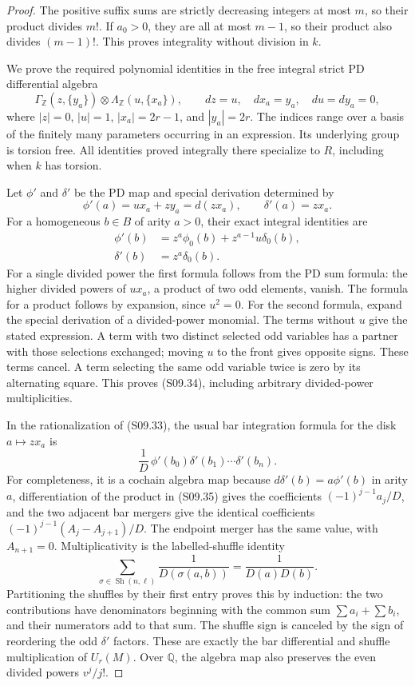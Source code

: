 \begin{proof}
The positive suffix sums are strictly decreasing
integers at most $m$, so their product divides $m!$.
If $a_0>0$, they are all at most $m-1$, so their
product also divides $(m-1)!$.  This proves integrality
without division in $k$.

We prove the required polynomial identities in the free
integral strict PD differential algebra
\[
 \Gamma_{\mathbb Z}(z,\{y_a\})\otimes
       \Lambda_{\mathbb Z}(u,\{x_a\}),
 \qquad dz=u,\quad dx_a=y_a,\quad du=dy_a=0,
 \tag{S09.33}
\]
where $|z|=0$, $|u|=1$, $|x_a|=2r-1$, and $|y_a|=2r$.
The indices range over a basis of the finitely many
parameters occurring in an expression.  Its underlying
group is torsion free.  All identities proved integrally
there specialize to $R$, including when $k$ has torsion.

Let $\phi'$ and $\delta'$ be the PD map and special
derivation determined by
\[
 \phi'(a)=u x_a+z y_a=d(zx_a),\qquad
 \delta'(a)=z x_a.
\]
For a homogeneous $b\in B$ of arity $a>0$, their exact
integral identities are
\[
 \begin{split}
 \phi'(b)&=z^a\phi_0(b)+z^{a-1}u\delta_0(b),\\
 \delta'(b)&=z^a\delta_0(b).
 \end{split}
 \tag{S09.34}
\]
For a single divided power the first formula follows
from the PD sum formula: the higher divided powers of
$u x_a$, a product of two odd elements, vanish.  The
formula for a product follows by expansion, since
$u^2=0$.  For the second formula, expand the special
derivation of a divided-power monomial.  The terms
without $u$ give the stated expression.  A term with
two distinct selected odd variables has a partner
with those selections exchanged; moving $u$ to the
front gives opposite signs.  These terms cancel.
A term selecting the same odd variable twice is zero
by its alternating square.  This proves (S09.34),
including arbitrary divided-power multiplicities.

In the rationalization of (S09.33), the usual bar
integration formula for the disk $a\mapsto z x_a$ is
\[
 \frac{1}{D}\,\phi'(b_0)
          \delta'(b_1)\cdots\delta'(b_n).
 \tag{S09.35}
\]
For completeness, it is a cochain algebra map because
$d\delta'(b)=a\phi'(b)$ in arity $a$, differentiation
of the product in (S09.35) gives the coefficients
$(-1)^{j-1}a_j/D$, and the two adjacent bar mergers
give the identical coefficients
$(-1)^{j-1}(A_j-A_{j+1})/D$.
The endpoint merger has the same value, with
$A_{n+1}=0$.  Multiplicativity is the labelled-shuffle
identity
\[
 \sum_{\sigma\in\operatorname{Sh}(n,\ell)}
       \frac{1}{D(\sigma(a,b))}
              =\frac{1}{D(a)D(b)}.
\]
Partitioning the shuffles by their first entry proves
this by induction: the two contributions have
denominators beginning with the common sum
$\sum a_i+\sum b_i$, and their numerators add to
that sum.  The shuffle sign is canceled by the sign
of reordering the odd $\delta'$ factors.  These are
exactly the bar differential and shuffle multiplication
of $U_r(M)$.  Over $\mathbb Q$, the algebra map also
preserves the even divided powers $v^j/j!$.


\end{proof}
